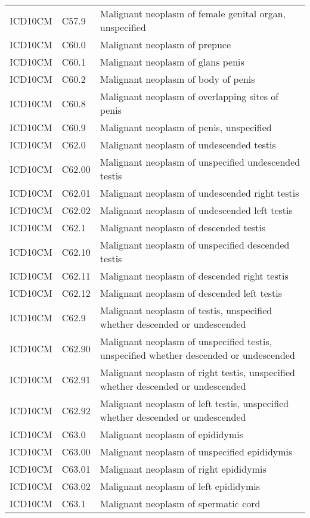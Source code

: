 \begin{longtable}{p{}p{}p{}}
  ICD10CM & C57.9 & Malignant neoplasm of female genital organ, unspecified \\ 
  ICD10CM & C60.0 & Malignant neoplasm of prepuce \\ 
  ICD10CM & C60.1 & Malignant neoplasm of glans penis \\ 
  ICD10CM & C60.2 & Malignant neoplasm of body of penis \\ 
  ICD10CM & C60.8 & Malignant neoplasm of overlapping sites of penis \\ 
  ICD10CM & C60.9 & Malignant neoplasm of penis, unspecified \\ 
  ICD10CM & C62.0 & Malignant neoplasm of undescended testis \\ 
  ICD10CM & C62.00 & Malignant neoplasm of unspecified undescended testis \\ 
  ICD10CM & C62.01 & Malignant neoplasm of undescended right testis \\ 
  ICD10CM & C62.02 & Malignant neoplasm of undescended left testis \\ 
  ICD10CM & C62.1 & Malignant neoplasm of descended testis \\ 
  ICD10CM & C62.10 & Malignant neoplasm of unspecified descended testis \\ 
  ICD10CM & C62.11 & Malignant neoplasm of descended right testis \\ 
  ICD10CM & C62.12 & Malignant neoplasm of descended left testis \\ 
  ICD10CM & C62.9 & Malignant neoplasm of testis, unspecified whether descended or undescended \\ 
  ICD10CM & C62.90 & Malignant neoplasm of unspecified testis, unspecified whether descended or undescended \\ 
  ICD10CM & C62.91 & Malignant neoplasm of right testis, unspecified whether descended or undescended \\ 
  ICD10CM & C62.92 & Malignant neoplasm of left testis, unspecified whether descended or undescended \\ 
  ICD10CM & C63.0 & Malignant neoplasm of epididymis \\ 
  ICD10CM & C63.00 & Malignant neoplasm of unspecified epididymis \\ 
  ICD10CM & C63.01 & Malignant neoplasm of right epididymis \\ 
  ICD10CM & C63.02 & Malignant neoplasm of left epididymis \\ 
  ICD10CM & C63.1 & Malignant neoplasm of spermatic cord \\ 

\end{longtable}

